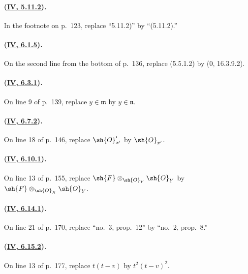 \paragraph{({\texorpdfstring{\protect\hyperlink{ega4.c04.cor.5-11-2}{IV, 5.11.2}}{IV, 5.11.2}}).}
In the footnote on p.~123, replace ``5.11.2)'' by ``(5.11.2).''

\paragraph{({\texorpdfstring{\protect\hyperlink{ega4.c04.prop.6-1-5}{IV, 6.1.5}}{IV, 6.1.5}}).}
On the second line from the bottom of p.~136, replace (5.5.1.2) by
($0$, 16.3.9.2).

\paragraph{({\texorpdfstring{\protect\hyperlink{ega4.c04.prop.6-3-1}{IV, 6.3.1}}{IV, 6.3.1}}).}
On line 9 of p.~139, replace $y\in\mathfrak m$ by $y\in\mathfrak n$.

\paragraph{({\texorpdfstring{\protect\hyperlink{ega4.c04.cor.6-7-2}{IV, 6.7.2}}{IV, 6.7.2}}).}
On line 18 of p.~146, replace $\sh{O}'_{x'}$ by $\sh{O}_{x'}$.

\paragraph{({\texorpdfstring{\protect\hyperlink{ega4.c04.statement.6-10-1}{IV, 6.10.1}}{IV, 6.10.1}}).}
On line 13 of p.~155, replace
$\sh{F}\otimes_{\sh{O}_Y}\sh{O}_Y$ by
$\sh{F}\otimes_{\sh{O}_X}\sh{O}_Y$.

\paragraph{({\texorpdfstring{\protect\hyperlink{ega4.c04.prop.6-14-1}{IV, 6.14.1}}{IV, 6.14.1}}).}
On line 21 of p.~170, replace ``no.~3, prop.~12'' by
``no.~2, prop.~8.''

\paragraph{({\texorpdfstring{\protect\hyperlink{ega4.c04.statement.6-15-2}{IV, 6.15.2}}{IV, 6.15.2}}).}
On line 13 of p.~177, replace $t(t-v)$ by $t^2(t-v)^2$.

